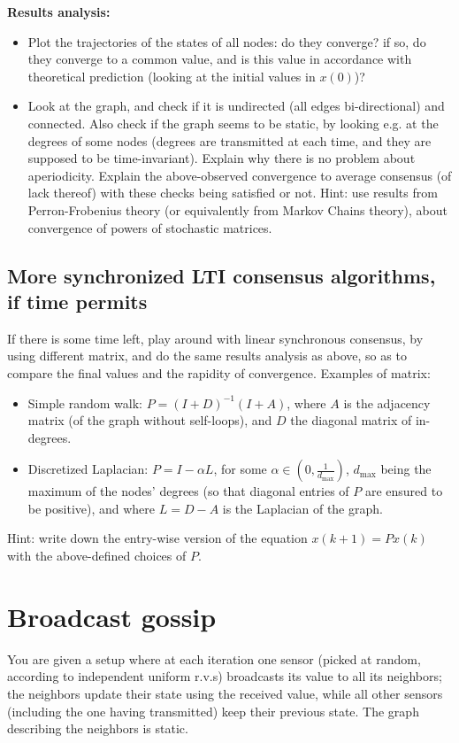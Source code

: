 \documentclass{article}
\begin{document}
\textbf{Results analysis:}
\begin{itemize}
\item Plot the trajectories of the states of all nodes: do they converge? if so, do they converge to a common value, and is this value in accordance with theoretical prediction (looking at the initial values in $x(0)$)?
\item Look at the graph, and check if it is undirected (all edges bi-directional) and connected. Also check if the graph seems to be static, by looking e.g. at the degrees of some nodes (degrees are transmitted at each time, and they are supposed to be time-invariant). Explain why there is no problem about aperiodicity.
Explain the above-observed convergence to average consensus (of lack thereof) with these checks being satisfied or not. Hint: use results from Perron-Frobenius theory (or equivalently from Markov Chains theory), about convergence of powers of stochastic matrices.
\end{itemize}

\subsection{More synchronized LTI consensus algorithms, if time permits}
If there is some time left, play around with linear synchronous consensus, by using different matrix, and do the same results analysis as above, so as to compare the final values and the rapidity of convergence. Examples of matrix:
\begin{itemize}
\item Simple random walk: $P = (I+D)^{-1} (I+A)$, where $A$ is the adjacency matrix (of the graph without self-loops), and $D$ the diagonal matrix of in-degrees.
\item Discretized Laplacian:  $P = I - \alpha L$, for some $\alpha \in (0,\frac{1}{d_{\max}})$, $d_{\max}$ being the maximum of the nodes' degrees (so that diagonal entries of $P$ are ensured to be positive), and where $L=D-A$ is the Laplacian of the graph.
\end{itemize}
Hint: write down the entry-wise version of the equation $x(k+1) = P x(k)$ with the above-defined choices of $P$.

\section{Broadcast gossip}
You are given a setup where at each iteration one sensor (picked at random, according to independent uniform r.v.s) broadcasts its value to all its neighbors; the neighbors update their state using the received value, while all other sensors (including the one having transmitted) keep their previous state. The graph describing the neighbors is static.\\
\end{document}
